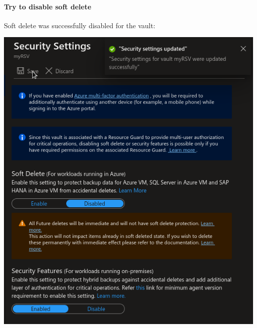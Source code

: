 \paragraph{Try to disable soft delete}
\label{sec:org6ff9cf1}
Soft delete was successfully disabled for the vault:
\begin{center}
\includegraphics[width=.9\linewidth]{figures/mua/soft_delete_disabled.png}
\end{center}
